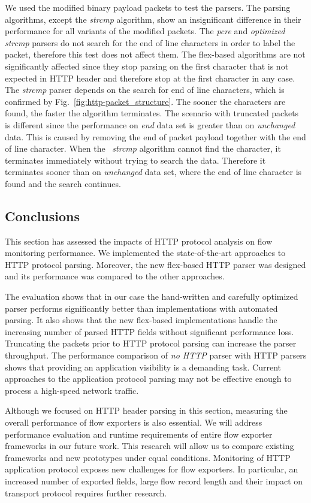 We used the modified binary payload packets to test the parsers. The parsing algorithms, except the \emph{strcmp} algorithm, show an insignificant difference in their performance for all variants of the modified packets. The \emph{pcre} and \emph{optimized strcmp} parsers do not search for the end of line characters in order to label the packet, therefore this test does not affect them. The flex-based algorithms are not significantly affected since they stop parsing on the first character that is not expected in HTTP header and therefore stop at the first character in any case. The \emph{strcmp} parser depends on the search for end of line characters, which is confirmed by Fig.~\ref{fig:http-packet_structure}. The sooner the characters are found, the faster the algorithm terminates. The scenario with truncated packets is different since the performance on \emph{end} data set is greater than on \emph{unchanged} data. This is caused by removing the end of packet payload together with the end of line character. When the \
\emph{strcmp} algorithm cannot find the character, it terminates immediately without trying to search the data. Therefore it terminates sooner than on \emph{unchanged} data set, where the end of line character is found and the search continues.

\subsection{Conclusions} \label{subsec:http-conclusion}

This section has assessed the impacts of HTTP protocol analysis on flow monitoring performance. We implemented the state-of-the-art approaches to HTTP protocol parsing. Moreover, the new flex-based HTTP parser was designed and its performance was compared to the other approaches.

The evaluation shows that in our case the hand-written and carefully optimized parser performs significantly better than implementations with automated parsing. It also shows that the new flex-based implementations handle the increasing number of parsed HTTP fields without significant performance loss. Truncating the packets prior to HTTP protocol parsing can increase the parser throughput. The performance comparison of \emph{no HTTP} parser with HTTP parsers shows that providing an application visibility is a demanding task. Current approaches to the application protocol parsing may not be effective enough to process a high-speed network traffic.

Although we focused on HTTP header parsing in this section, measuring the overall performance of flow exporters is also essential. We will address performance evaluation and runtime requirements of entire flow exporter frameworks in our future work. This research will allow us to compare existing frameworks and new prototypes under equal conditions. Monitoring of HTTP application protocol exposes new challenges for flow exporters. In particular, an increased number of exported fields, large flow record length and their impact on transport protocol requires further research.


